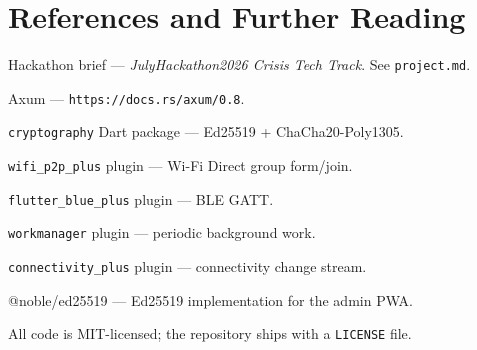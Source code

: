 \documentclass[11pt,a4paper]{article}
\begin{document}
\section{References and Further Reading}
\label{sec:appendix-refs}

\begin{enumerate}[leftmargin=*,label={[\arabic*]}]
  \item Hackathon brief --- \emph{JulyHackathon2026 Crisis Tech Track}.
        See \texttt{project.md}.
  \item Axum --- \texttt{https://docs.rs/axum/0.8}.
  \item \texttt{cryptography} Dart package --- Ed25519 + ChaCha20-Poly1305.
  \item \texttt{wifi\_p2p\_plus} plugin --- Wi-Fi Direct group form/join.
  \item \texttt{flutter\_blue\_plus} plugin --- BLE GATT.
  \item \texttt{workmanager} plugin --- periodic background work.
  \item \texttt{connectivity\_plus} plugin --- connectivity change stream.
  \item @noble/ed25519 --- Ed25519 implementation for the admin PWA.
  \item All code is MIT-licensed; the repository ships with a
        \texttt{LICENSE} file.
\end{enumerate}
\end{document}
